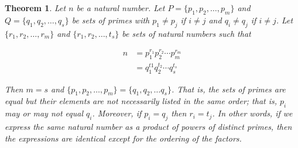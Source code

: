 \documentclass{article}
\newtheorem{thm}{Theorem}[section]
\numberwithin{equation}{thm}
\begin{document}
\begin{thm} \label{2.9}
  Let $n$ be a natural number. Let $P = \{p_1, p_2, \ldots, p_m\}$ and $Q = \{q_1, q_2,\ldots, q_s\}$ be sets of primes with $p_1 \neq p_j$ if $i \neq j$ and $q_i \neq q_j$ if $i \neq j$. Let $\{r_1, r_2, \ldots, r_m\}$ and $\{r_1, r_2,\ldots,t_s\}$ be sets of natural numbers such that

  \begin{align*}
    n &= p_1^{r_1} p_2^{r_2} \cdots p_m^{r_m} \\
      &= q_1^{t1} q_2^{t_2} \cdots q_s^{t_s}
  \end{align*}

  Then $m = s$ and $\{p_1, p_2, \ldots, p_m\} = \{q_1, q_2, \ldots q_s \}$. That is, the sets of primes are equal but their elements are not necessarily listed in the same order; that is, $p_i$ may or may not equal $q_i$. Moreover, if $p_i = q_j$ then $r_i = t_j$. In other words, if we express the same natural number as a product of powers of distinct primes, then the expressions are identical except for the ordering of the factors.
\end{thm}
\end{document}
